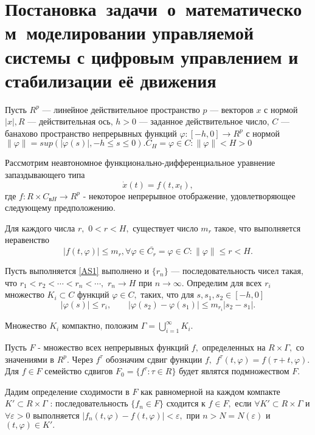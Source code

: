 \section{Постановка~задачи~о~математическом~моделировании управляемой системы с цифровым управлением и стабилизации её движения} \label{p11}

	Пусть $R^p$ --- линейное действительное пространство $p$ --- векторов $x$ с нормой $|x|,  R$ 
	--- действительная ось, $h>0$ --- заданное действительное число, $C$ --- банахово пространство
	непрерывных функций $\varphi:[-h,0] \rightarrow R^p$ с нормой $\|\varphi\|=sup(|\varphi(s)|,-h \le s \le 0). C_H = {\varphi \in C : \| \varphi \| < H > 0}$
	
	Рассмотрим неавтономное  функционально-дифференциальное
	уравнение запаздывающего типа
	\begin{equation}
	\dot x(t) = f(t,x_t), \label{1.1'}
	\end{equation}
	где $f: R \times C_{вH}\to R^p$ - некоторое непрерывное отображение,
	удовлетворяющее  следующему предположению.
	
	\begin{Ass}\label{AS1} Для  каждого  числа $r,$ $0<r<H,$
		существует число $m_r$ такое, что выполняется неравенство
		\begin{equation}\label{1.2'}
		\left| f(t, \varphi) \right|\le m_r, \forall \varphi \in \bar{C_r} = {\varphi \in C: \| \varphi \| \le r < H}.
		\end{equation}
	\end{Ass}
	
	Пусть выполняется \ref{AS1} выполнено и $\{r_n\}$ ---
	последовательность чисел такая, что $r_1<r_2<\cdots <r_n<\cdots, $
	$r_n\to H$ при $n\to \infty .$ Определим для всех $r_i$
	множество $K_i\subset C$ функций $\varphi \in C,$ таких, что
	для $s, s_1,s_2 \in [-h,0]$  $$|\varphi (s)|\le r_i, \qquad
	|\varphi (s_2)-\varphi (s_1)|\le m_{r_i} |s_2-s_1|.$$
	
	Множество $K_i$ компактно, положим $\Gamma =\bigcup\limits_{i=1}^{\infty } {K_i}.$
	
	Пусть $F$ - множество всех непрерывных функций $f,$
	определенных на $R \times \Gamma,$ со значениями в $R^p.$
	Через $f^{\tau }$ обозначим сдвиг функции $f,$ $f^{\tau }(t,\varphi )=f(\tau +t,\varphi ).$
	Для $f\in F$ семейство сдвигов $F_0=\{f^{\tau }:\tau\in
	R\}$ будет являтся подмножеством $F.$
	
	Дадим определение сходимости в $F$ как равномерной на каждом компакте
	$K'\subset R\times \Gamma $ : последовательность
	$\{f_n\in F\}$ сходится к $f\in F,$ если $\forall K'\subset
	R\times\Gamma $ и $\forall \varepsilon >0$ выполняется $|f_n(t,\varphi
	)-f(t,\varphi )|<\varepsilon,$ при $n>N=N(\varepsilon )$ и
	$(t,\varphi )\in K'.$
	
